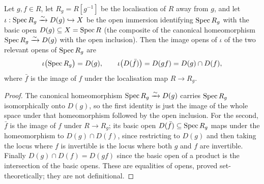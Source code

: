 \begin{lemma}\leanok
  \label{lem:tile_image_opens_identities}
  Let \(g, f \in R\), let \(R_g = R[g^{-1}]\) be the localisation of \(R\) away from \(g\), and
  let \(\iota : \operatorname{Spec} R_g \xrightarrow{\sim} D(g) \hookrightarrow X\) be the open immersion
  identifying \(\operatorname{Spec} R_g\) with the basic open \(D(g) \subseteq X = \operatorname{Spec} R\) (the composite of the
  canonical homeomorphism \(\operatorname{Spec} R_g \xrightarrow{\sim} D(g)\) with the open inclusion). Then the image
  opens of \(\iota\) of the two relevant opens of \(\operatorname{Spec} R_g\) are
  \[
    \iota\bigl(\operatorname{Spec} R_g\bigr) = D(g),
    \qquad
    \iota\bigl(D(\bar f)\bigr) = D(gf) = D(g) \cap D(f),
  \]
  where \(\bar f\) is the image of \(f\) under the localisation map \(R \to R_g\).
\end{lemma}
\begin{proof}
  \leanok
  The canonical homeomorphism \(\operatorname{Spec} R_g \xrightarrow{\sim} D(g)\) carries \(\operatorname{Spec} R_g\)
  isomorphically onto \(D(g)\), so the first identity is just the image of the whole space under that
  homeomorphism followed by the open inclusion. For the second, \(\bar f\) is the image of \(f\) under
  \(R \to R_g\); its basic open \(D(\bar f) \subseteq \operatorname{Spec} R_g\) maps under the homeomorphism to
  \(D(g) \cap D(f)\), since restricting to \(D(g)\) and then taking the locus where \(f\) is invertible
  is the locus where both \(g\) and \(f\) are invertible. Finally \(D(g) \cap D(f) = D(gf)\) since the
  basic open of a product is the intersection of the basic opens. These are equalities of opens, proved
  set-theoretically; they are not definitional.
\end{proof}

